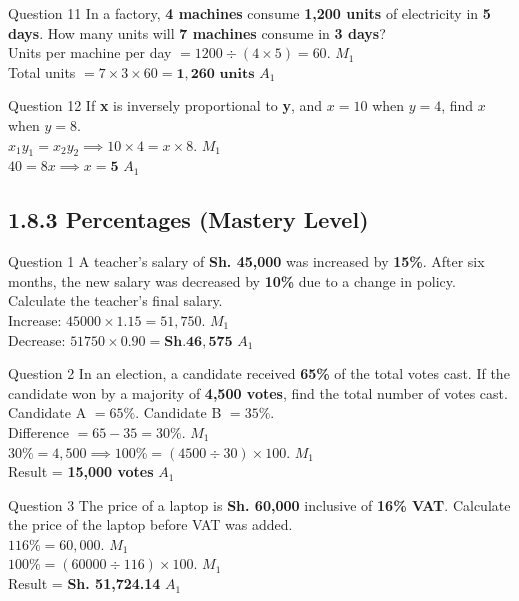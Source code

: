 \documentclass[12pt, a4paper, oneside]{article}
\begin{document}
\begin{solvingbox}{Question 11}
In a factory, \textbf{4 machines} consume \textbf{1,200 units} of electricity in \textbf{5 days}. How many units will \textbf{7 machines} consume in \textbf{3 days}? \\
Units per machine per day $= 1200 \div (4 \times 5) = 60$. \hfill $M_1$ \\
Total units $= 7 \times 3 \times 60 = \mathbf{1,260\text{ units}}$ \hfill $A_1$
\end{solvingbox}

\begin{solvingbox}{Question 12}
If \textbf{x} is inversely proportional to \textbf{y}, and $x = 10$ when $y = 4$, find $x$ when $y = 8$. \\
$x_1 y_1 = x_2 y_2 \implies 10 \times 4 = x \times 8$. \hfill $M_1$ \\
$40 = 8x \implies x = \mathbf{5}$ \hfill $A_1$
\end{solvingbox}

\subsection*{1.8.3 Percentages (Mastery Level)}

\begin{solvingbox}{Question 1}
A teacher's salary of \textbf{Sh. 45,000} was increased by \textbf{15\%}. After six months, the new salary was decreased by \textbf{10\%} due to a change in policy. Calculate the teacher's final salary. \\
Increase: $45000 \times 1.15 = 51,750$. \hfill $M_1$ \\
Decrease: $51750 \times 0.90 = \mathbf{Sh. 46,575}$ \hfill $A_1$
\end{solvingbox}

\begin{solvingbox}{Question 2}
In an election, a candidate received \textbf{65\%} of the total votes cast. If the candidate won by a majority of \textbf{4,500 votes}, find the total number of votes cast. \\
Candidate A $= 65\%$. Candidate B $= 35\%$. \\
Difference $= 65 - 35 = 30\%$. \hfill $M_1$ \\
$30\% = 4,500 \implies 100\% = (4500 \div 30) \times 100$. \hfill $M_1$ \\
Result = \textbf{15,000 votes} \hfill $A_1$
\end{solvingbox}

\begin{solvingbox}{Question 3}
The price of a laptop is \textbf{Sh. 60,000} inclusive of \textbf{16\% VAT}. Calculate the price of the laptop before VAT was added. \\
$116\% = 60,000$. \hfill $M_1$ \\
$100\% = (60000 \div 116) \times 100$. \hfill $M_1$ \\
Result = \textbf{Sh. 51,724.14} \hfill $A_1$
\end{solvingbox}
\end{document}
